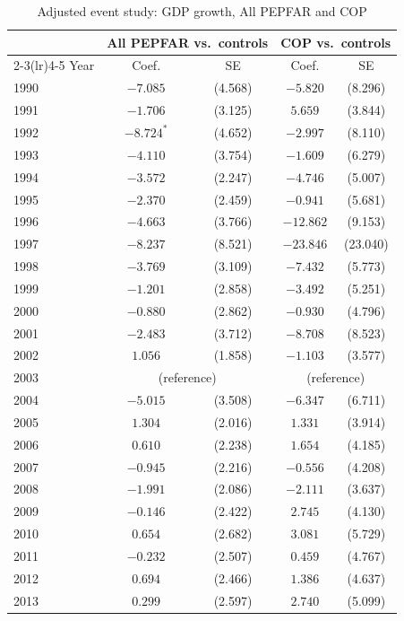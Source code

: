 \begin{table}[htbp]
\centering
\small
\caption{Adjusted event study: GDP growth, All PEPFAR and COP}
\label{tab:crown_es_combined_gdp_growth}
\begin{tabular}{lcccc}
\toprule
 & \multicolumn{2}{c}{All PEPFAR vs.\ controls} & \multicolumn{2}{c}{COP vs.\ controls} \\
\cmidrule(lr){2-3}\cmidrule(lr){4-5}
Year & Coef. & SE & Coef. & SE \\
\midrule
1990 & $-7.085$ & (4.568) & $-5.820$ & (8.296) \\
1991 & $-1.706$ & (3.125) & $5.659$ & (3.844) \\
1992 & $-8.724^{*}$ & (4.652) & $-2.997$ & (8.110) \\
1993 & $-4.110$ & (3.754) & $-1.609$ & (6.279) \\
1994 & $-3.572$ & (2.247) & $-4.746$ & (5.007) \\
1995 & $-2.370$ & (2.459) & $-0.941$ & (5.681) \\
1996 & $-4.663$ & (3.766) & $-12.862$ & (9.153) \\
1997 & $-8.237$ & (8.521) & $-23.846$ & (23.040) \\
1998 & $-3.769$ & (3.109) & $-7.432$ & (5.773) \\
1999 & $-1.201$ & (2.858) & $-3.492$ & (5.251) \\
2000 & $-0.880$ & (2.862) & $-0.930$ & (4.796) \\
2001 & $-2.483$ & (3.712) & $-8.708$ & (8.523) \\
2002 & $1.056$ & (1.858) & $-1.103$ & (3.577) \\
2003 & \multicolumn{2}{c}{(reference)} & \multicolumn{2}{c}{(reference)} \\
2004 & $-5.015$ & (3.508) & $-6.347$ & (6.711) \\
2005 & $1.304$ & (2.016) & $1.331$ & (3.914) \\
2006 & $0.610$ & (2.238) & $1.654$ & (4.185) \\
2007 & $-0.945$ & (2.216) & $-0.556$ & (4.208) \\
2008 & $-1.991$ & (2.086) & $-2.111$ & (3.637) \\
2009 & $-0.146$ & (2.422) & $2.745$ & (4.130) \\
2010 & $0.654$ & (2.682) & $3.081$ & (5.729) \\
2011 & $-0.232$ & (2.507) & $0.459$ & (4.767) \\
2012 & $0.694$ & (2.466) & $1.386$ & (4.637) \\
2013 & $0.299$ & (2.597) & $2.740$ & (5.099) \\

\end{tabular}
\end{table}
